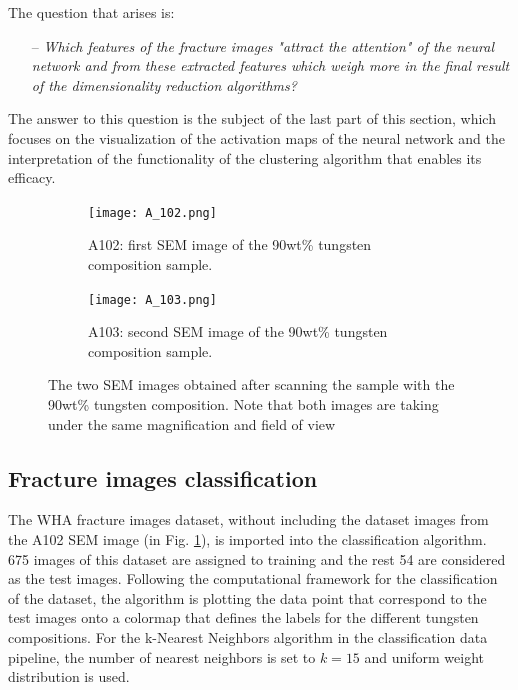 \documentclass[authoryear,preprint,review,12pt, singleside]{elsarticle}
\begin{document}
The question that arises is:

\begin{itemize}
	\item[--] \textit{Which features of the fracture images "attract the attention" of the neural network and from these extracted features which weigh more in the final result of the dimensionality reduction algorithms?}
\end{itemize}
     
The answer to this question is the subject of the last part of this section, which focuses on the visualization of the activation maps of the neural network and the interpretation of the functionality of the clustering algorithm that enables its efficacy.


\begin{figure}[!h]
	\centering
	\begin{subfigure}[b]{0.49\textwidth}
		\centering
		\texttt{[image: A\_102.png]}
		\caption{A102: first SEM image of the 90wt\% tungsten composition sample.}
		\label{fig:A_102}
	\end{subfigure}
	\begin{subfigure}[b]{0.49\textwidth}
		\centering
		\texttt{[image: A\_103.png]}
		\caption{A103: second SEM image of the 90wt\% tungsten composition sample.}
		\label{fig:A_103}
	\end{subfigure}
	\caption{The two SEM images obtained after scanning the sample with the 90wt\% tungsten composition. Note that both images are taking under the same magnification and field of view}
	\label{fig:se}
\end{figure}

  
 
\subsection{Fracture images classification}

The WHA fracture images dataset, without including the dataset images from the A102 SEM image (in Fig. \ref{fig:A_102}), is imported into the classification algorithm. 675 images of this dataset are assigned to training and the rest 54 are considered as the test images. Following the computational framework for the classification of the dataset, the algorithm is plotting the data point that correspond to the test images onto a colormap that defines the labels for the different tungsten compositions. For the k-Nearest Neighbors algorithm in the classification data pipeline, the number of nearest neighbors is set to $k=15$ and uniform weight distribution is used.
\end{document}
